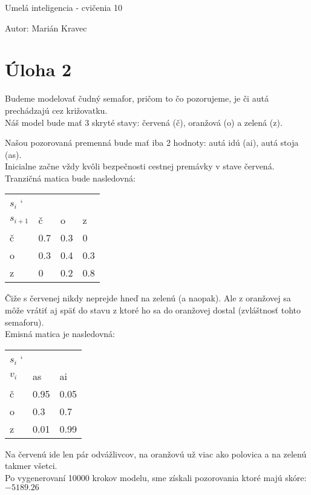 \documentclass[a4paper]{article}
\begin{document}
 
	
\pagestyle{plain}

\begin{center}
	\sc\large
	Umelá inteligencia - cvičenia 10
\end{center}

Autor: Marián Kravec

\section{Úloha 2}

Budeme modelovať čudný semafor, pričom to čo pozorujeme, je či autá prechádzajú cez križovatku.
\\

Náš model bude mať 3 skryté stavy: červená (č), oranžová (o) a zelená (z).

Našou pozorovaná premenná bude mať iba 2 hodnoty: autá idú (ai), autá stoja (as).
\\

Inicialne začne vždy kvôli bezpečnosti cestnej premávky v stave červená.
\\ 

Tranzičná matica bude nasledovná:

\begin{table}[h!]
	\begin{tabular}{|l|l|l|l|}
		\hline
		$s_i$ \char`\\ $s_{i+1}$ & č   & o   & z   \\ \hline
		č                    & 0.7 & 0.3 & 0   \\ \hline
		o                    & 0.3 & 0.4 & 0.3 \\ \hline
		z                    & 0   & 0.2 & 0.8 \\ \hline
	\end{tabular}
\end{table}

Čiže s červenej nikdy neprejde hneď na zelenú (a naopak). Ale z oranžovej sa môže vrátiť aj späť do stavu z ktoré ho sa do oranžovej dostal (zvláštnosť tohto semaforu).
\\

Emisná matica je nasledovná:

\begin{table}[h!]
	\begin{tabular}{|l|l|l|}
		\hline
		$s_i$ \char`\\ $v_i$ & as   & ai     \\ \hline
		č                    & 0.95 & 0.05  \\ \hline
		o                    & 0.3  & 0.7  \\ \hline
		z                    & 0.01 & 0.99  \\ \hline
	\end{tabular}
\end{table}

Na červenú ide len pár odvážlivcov, na oranžovú už viac ako polovica a na zelenú takmer všetci.
\\

Po vygenerovaní 10000 krokov modelu, sme získali pozorovania ktoré majú skóre: $-5189.26$
\end{document}
